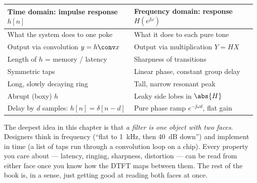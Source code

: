 \begin{center}
\renewcommand{\arraystretch}{1.3}
\begin{tabular}{@{}p{} p{}@{}}
\toprule
\textbf{Time domain: impulse response $h[n]$} & \textbf{Frequency domain: response $H(e^{\jj\omega})$} \\
\midrule
What the system does to one poke & What it does to each pure tone \\
Output via convolution $y=h\conv x$ & Output via multiplication $Y=HX$ \\
Length of $h$ = memory / latency & Sharpness of transitions \\
Symmetric taps & Linear phase, constant group delay \\
Long, slowly decaying ring & Tall, narrow resonant peak \\
Abrupt (boxy) $h$ & Leaky side lobes in $\abs{H}$ \\
Delay by $d$ samples: $h[n]=\delta[n-d]$ & Pure phase ramp $e^{-\jj\omega d}$, flat gain \\
\bottomrule
\end{tabular}
\end{center}

\begin{aestheticbox}
The deepest idea in this chapter is that \emph{a filter is one object with two
faces}. Designers think in frequency (``flat to 1~kHz, then 40~dB down'') and
implement in time (a list of taps run through a convolution loop on a chip).
Every property you care about --- latency, ringing, sharpness, distortion ---
can be read from either face once you know how the DTFT maps between them. The
rest of the book is, in a sense, just getting good at reading both faces at once.
\end{aestheticbox}

